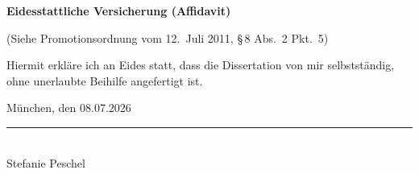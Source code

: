 \cleardoublepage
\thispagestyle{empty}

\vspace*{2.2cm}

{\Large\bfseries
Eidesstattliche Versicherung (Affidavit)\par}

\vspace{0.4cm}

{\normalsize
(Siehe Promotionsordnung vom 12.\ Juli 2011, \S\,8 Abs.\ 2 Pkt.\ 5)\par}

\vspace{1.5cm}

\noindent
Hiermit erkläre ich an Eides statt, dass die Dissertation von mir selbstständig, ohne unerlaubte Beihilfe angefertigt ist.

\vspace{1.5cm}

\noindent
München, den 08.07.2026
\hfill
\begin{minipage}[t]{0.36\textwidth}
  \centering
  \rule{\textwidth}{0.4pt}\\[-0.1cm]
  Stefanie Peschel
\end{minipage}

\vspace*{1.8cm}